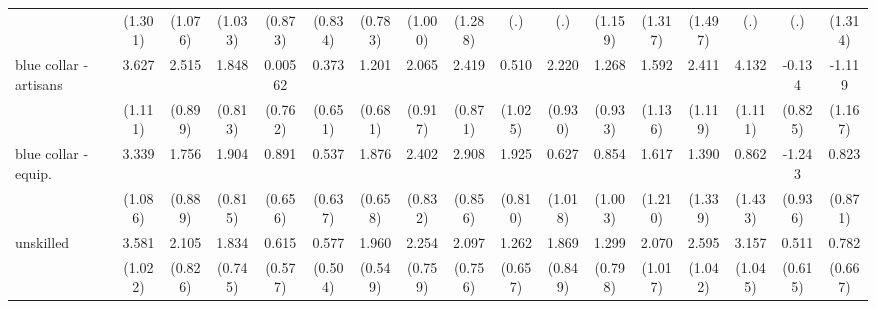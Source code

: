 {\begin{tabular}{l*{16}{c}}
                    &     (1.301)         &     (1.076)         &     (1.033)         &     (0.873)         &     (0.834)         &     (0.783)         &     (1.000)         &     (1.288)         &         (.)         &         (.)         &     (1.159)         &     (1.317)         &     (1.497)         &         (.)         &         (.)         &     (1.314)         \\
[1em]
blue collar - artisans&       3.627\sym{**} &       2.515\sym{**} &       1.848\sym{*}  &     0.00562         &       0.373         &       1.201         &       2.065\sym{*}  &       2.419\sym{**} &       0.510         &       2.220\sym{*}  &       1.268         &       1.592         &       2.411\sym{*}  &       4.132\sym{***}&      -0.134         &      -1.119         \\
                    &     (1.111)         &     (0.899)         &     (0.813)         &     (0.762)         &     (0.651)         &     (0.681)         &     (0.917)         &     (0.871)         &     (1.025)         &     (0.930)         &     (0.933)         &     (1.136)         &     (1.119)         &     (1.111)         &     (0.825)         &     (1.167)         \\
[1em]
blue collar - equip.&       3.339\sym{**} &       1.756\sym{*}  &       1.904\sym{*}  &       0.891         &       0.537         &       1.876\sym{**} &       2.402\sym{**} &       2.908\sym{***}&       1.925\sym{*}  &       0.627         &       0.854         &       1.617         &       1.390         &       0.862         &      -1.243         &       0.823         \\
                    &     (1.086)         &     (0.889)         &     (0.815)         &     (0.656)         &     (0.637)         &     (0.658)         &     (0.832)         &     (0.856)         &     (0.810)         &     (1.018)         &     (1.003)         &     (1.210)         &     (1.339)         &     (1.433)         &     (0.936)         &     (0.871)         \\
[1em]
unskilled           &       3.581\sym{***}&       2.105\sym{*}  &       1.834\sym{*}  &       0.615         &       0.577         &       1.960\sym{***}&       2.254\sym{**} &       2.097\sym{**} &       1.262         &       1.869\sym{*}  &       1.299         &       2.070\sym{*}  &       2.595\sym{*}  &       3.157\sym{**} &       0.511         &       0.782         \\
                    &     (1.022)         &     (0.826)         &     (0.745)         &     (0.577)         &     (0.504)         &     (0.549)         &     (0.759)         &     (0.756)         &     (0.657)         &     (0.849)         &     (0.798)         &     (1.017)         &     (1.042)         &     (1.045)         &     (0.615)         &     (0.667)         \\

\end{tabular}}
